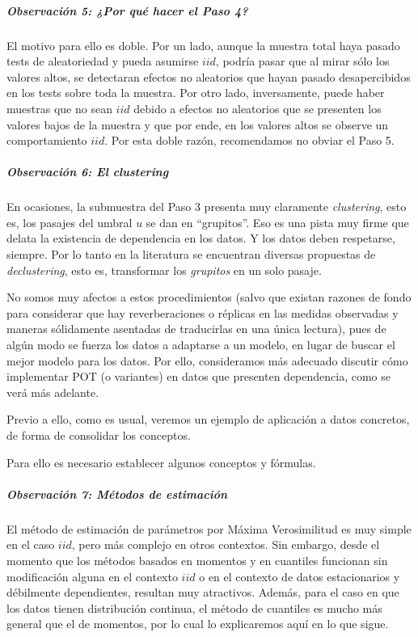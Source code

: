 \documentclass[
  12pt]{article}
\begin{document}
\subparagraph{Observación 5: ¿Por qué hacer el Paso
4?}\label{observaciuxf3n-5-por-quuxe9-hacer-el-paso-4}

El motivo para ello es doble. Por un lado, aunque la muestra total haya
pasado tests de aleatoriedad y pueda asumirse \(iid\), podría pasar que
al mirar sólo los valores altos, se detectaran efectos no aleatorios que
hayan pasado desapercibidos en los tests sobre toda la muestra. Por otro
lado, inversamente, puede haber muestras que no sean \(iid\) debido a
efectos no aleatorios que se presenten los valores bajos de la muestra y
que por ende, en los valores altos se observe un comportamiento \(iid\).
Por esta doble razón, recomendamos no obviar el Paso 5.

\subparagraph{\texorpdfstring{Observación 6: El
\emph{clustering}}{Observación 6: El clustering}}\label{observaciuxf3n-6-el-clustering}

En ocasiones, la submuestra del Paso 3 presenta muy claramente
\emph{clustering}, esto es, los pasajes del umbral \(u\) se dan en
``grupitos''. Eso es una pista muy firme que delata la existencia de
dependencia en los datos. Y los datos deben respetarse, siempre. Por lo
tanto en la literatura se encuentran diversas propuestas de
\emph{declustering}, esto es, transformar los \emph{grupitos} en un solo
pasaje.

No somos muy afectos a estos procedimientos (salvo que existan razones
de fondo para considerar que hay reverberaciones o réplicas en las
medidas observadas y maneras sólidamente asentadas de traducirlas en una
única lectura), pues de algún modo se fuerza los datos a adaptarse a un
modelo, en lugar de buscar el mejor modelo para los datos. Por ello,
consideramos más adecuado discutir cómo implementar POT (o variantes) en
datos que presenten dependencia, como se verá más adelante.

Previo a ello, como es usual, veremos un ejemplo de aplicación a datos
concretos, de forma de consolidar los conceptos.

Para ello es necesario establecer algunos conceptos y fórmulas.

\subparagraph{Observación 7: Métodos de
estimación}\label{observaciuxf3n-7-muxe9todos-de-estimaciuxf3n}

El método de estimación de parámetros por Máxima Verosimilitud es muy
simple en el caso \(iid\), pero más complejo en otros contextos. Sin
embargo, desde el momento que los métodos basados en momentos y en
cuantiles funcionan sin modificación alguna en el contexto \(iid\) o en
el contexto de datos estacionarios y débilmente dependientes, resultan
muy atractivos. Además, para el caso en que los datos tienen
distribución continua, el método de cuantiles es mucho más general que
el de momentos, por lo cual lo explicaremos aquí en lo que sigue.
\end{document}
